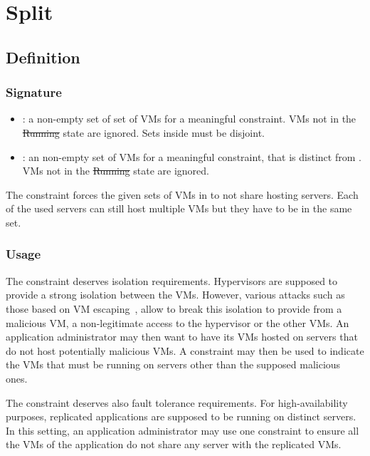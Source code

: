\section{Split}

\subsection{Definition}

\subsubsection{Signature} 

\begin{itemize}
\item {} : a non-empty set of set of VMs for a meaningful constraint. VMs not in the \st{Running} state are ignored. Sets inside  must be disjoint.
\item {} : an non-empty set of VMs for a meaningful constraint, that is distinct from . VMs not in the \st{Running} state are ignored.
\end{itemize}

The  constraint forces the given sets of VMs in  to not share hosting servers.
Each of the used servers can still host multiple VMs but they have to be in the same set.


\subsubsection{Usage}

The  constraint deserves isolation requirements. Hypervisors are supposed
to provide a strong isolation between the VMs.  However, various attacks such as those based on 
VM escaping~\cite{wojtczuk}, allow to break this isolation to provide from a malicious VM, a non-legitimate access to the hypervisor or the other VMs.
An application administrator may then want to have its VMs hosted on servers that do not
host potentially malicious VMs. A  constraint may then be used to indicate the VMs that must be running on servers other than the supposed malicious ones.

The  constraint deserves also fault tolerance requirements. For high-availability purposes,
replicated applications are supposed to be running on distinct servers. In this setting, an application
administrator may use one  constraint to ensure all the VMs of the application do not
share any server with the replicated VMs.

